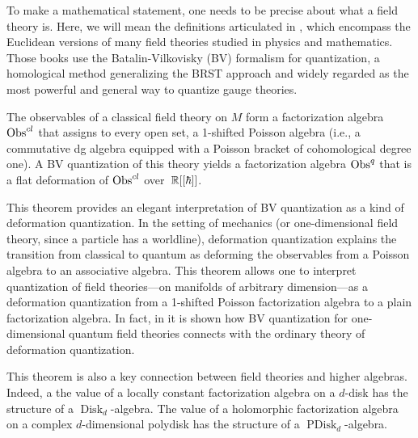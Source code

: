 \documentclass[11pt]{amsart}
\renewcommand{\op}{\operatorname}
\begin{document}
To make a mathematical statement, one needs to be precise about what a field theory is.
Here, we will mean the definitions articulated in \cite{CosBook,CG1, CG2}, which encompass the Euclidean versions of many field theories studied in physics and mathematics.
Those books use the Batalin-Vilkovisky (BV) formalism for quantization, a homological method generalizing the BRST approach and widely regarded as the most powerful and general way to quantize gauge theories. 

\begin{thm}
\label{main}
The observables of a classical field theory on $M$ form a factorization algebra ${\rm Obs}^{cl}$ that assigns to every open set, a 1-shifted Poisson algebra (i.e., a commutative dg algebra equipped with a Poisson bracket of cohomological degree one). A BV quantization of this theory yields a factorization algebra ${\rm Obs}^q$ that is a flat deformation of ${\rm Obs}^{cl}$ over~$\mathbb R[[\hbar]]$.
\end{thm}

This theorem provides an elegant interpretation of BV quantization as a kind of deformation quantization. 
In the setting of mechanics (or one-dimensional field theory, since a particle has a worldline), deformation quantization explains the transition from classical to quantum as deforming the observables from a Poisson algebra to an associative algebra. 
This theorem allows one to interpret quantization of field theories---on manifolds of arbitrary dimension---as a deformation quantization from a 1-shifted Poisson factorization algebra to a plain factorization algebra. 
In fact, in \cite{GLL,GLX} it is shown how BV quantization for one-dimensional quantum field theories connects with the ordinary theory of deformation quantization. 

This theorem is also a key connection between field theories and higher algebras.
Indeed, a the value of a locally constant factorization algebra on a $d$-disk has the structure of a $\op{Disk}_d$-algebra.
The value of a holomorphic factorization algebra on a complex $d$-dimensional polydisk has the structure of a $\op{PDisk}_d$-algebra.
\end{document}
